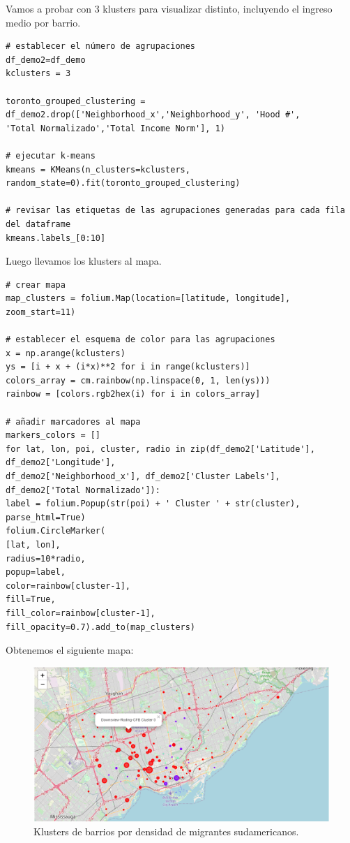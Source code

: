 \documentclass[10pt,a4paper,arial, spanish]{article}
\begin{document}
Vamos a probar con 3 klusters para visualizar distinto, incluyendo el ingreso medio por barrio.
\begin{verbatim}
# establecer el número de agrupaciones
df_demo2=df_demo
kclusters = 3

toronto_grouped_clustering = df_demo2.drop(['Neighborhood_x','Neighborhood_y', 'Hood #', 
'Total Normalizado','Total Income Norm'], 1)

# ejecutar k-means
kmeans = KMeans(n_clusters=kclusters, random_state=0).fit(toronto_grouped_clustering)

# revisar las etiquetas de las agrupaciones generadas para cada fila del dataframe
kmeans.labels_[0:10] 
\end{verbatim}

Luego llevamos los klusters al mapa.
\begin{verbatim}
# crear mapa
map_clusters = folium.Map(location=[latitude, longitude], zoom_start=11)

# establecer el esquema de color para las agrupaciones
x = np.arange(kclusters)
ys = [i + x + (i*x)**2 for i in range(kclusters)]
colors_array = cm.rainbow(np.linspace(0, 1, len(ys)))
rainbow = [colors.rgb2hex(i) for i in colors_array]

# añadir marcadores al mapa
markers_colors = []
for lat, lon, poi, cluster, radio in zip(df_demo2['Latitude'], df_demo2['Longitude'],
df_demo2['Neighborhood_x'], df_demo2['Cluster Labels'], df_demo2['Total Normalizado']):
label = folium.Popup(str(poi) + ' Cluster ' + str(cluster), parse_html=True)
folium.CircleMarker(
[lat, lon],
radius=10*radio,
popup=label,
color=rainbow[cluster-1],
fill=True,
fill_color=rainbow[cluster-1],
fill_opacity=0.7).add_to(map_clusters)
\end{verbatim}

Obtenemos el siguiente mapa:
\begin{figure}[H]
	\centering
	\includegraphics[scale=0.45]{map3}
	\caption[Klusters de barrios por densidad de migrantes sudamericanos.]{Klusters de barrios por densidad de migrantes sudamericanos.}
	\label{fig:map3}
\end{figure}
\end{document}
